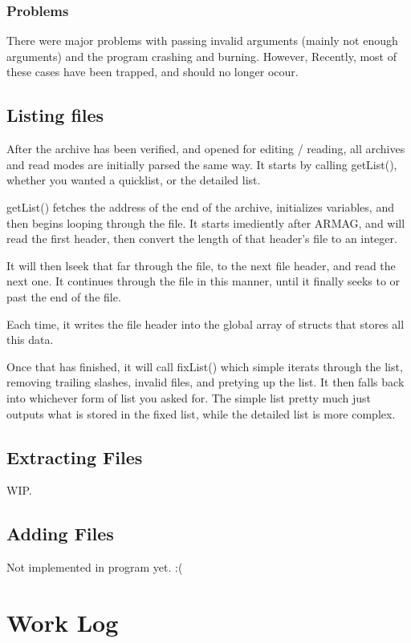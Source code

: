 \documentclass[letterpaper,10pt,titlepage]{article}
\begin{document}
\subsubsection{Problems}

There were major problems with passing invalid arguments (mainly not enough arguments) and the program crashing and burning.  However, Recently, most of these cases have been trapped, and should no longer ocour.

\subsection{Listing files}

After the archive has been verified, and opened for editing / reading, all archives and read modes are initially parsed the same way.  It starts by calling getList(), whether you wanted a quicklist, or the detailed list.

getList() fetches the address of the end of the archive, initializes variables, and then begins looping through the file.  It starts imediently after ARMAG, and will read the first header, then convert the length of that header's file to an integer.

It will then lseek that far through the file, to the next file header, and read the next one.  It continues through the file in this manner, until it finally seeks to or past the end of the file.

Each time, it writes the file header into the global array of structs that stores all this data.

Once that has finished, it will call fixList() which simple iterats through the list, removing trailing slashes, invalid files, and pretying up the list.  It then falls back into whichever form of list you asked for.  The simple list pretty much just outputs what is stored in the fixed list, while the detailed list is more complex.

\subsection{Extracting Files}

WIP.

\subsection{Adding Files}

Not implemented in program yet.  :(

\section{Work Log}
\end{document}
